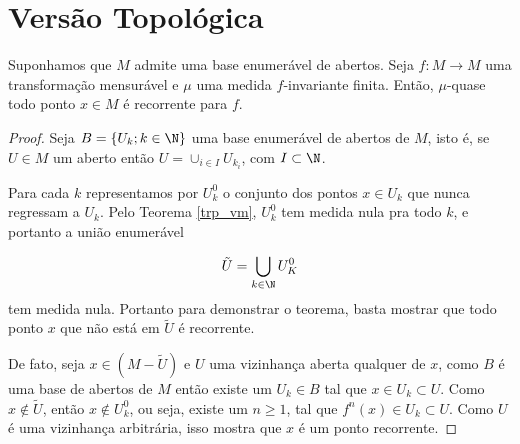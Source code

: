 \section{Versão Topológica}

\begin{teorema}\label{trp_vt}
Suponhamos que $M$ admite uma base enumerável de abertos. Seja $f:M \to M$ uma transformação mensurável e $\mu$ uma medida $f$-invariante finita. Então, $\mu$-quase todo ponto $x\in M$ é recorrente para $f$.
\end{teorema}

\begin{proof}
Seja $B=\{U_k;k\in\N\}$ uma base enumerável de abertos de $M$, isto é, se $U\in M$ um aberto então $U=\cup_{i\in I}{U_{k_i}}$, com $I\subset\N$. 

Para cada $k$ representamos por $U_{k}^{0}$ o conjunto dos pontos $x\in U_k$ que nunca regressam a $U_k$. Pelo Teorema \ref{trp_vm}, $U_{k}^{0}$ tem medida nula pra todo $k$, e portanto a união enumerável 

\begin{equation*}
\tilde{U}=\bigcup_{k\in\N}{U_{K}^{0}}         \vspace{0.2cm}
\end{equation*}
tem medida nula. Portanto para demonstrar o teorema, basta mostrar que todo ponto $x$ que não está em $\tilde{U}$ é recorrente. 

De fato, seja $x\in(M-\tilde{U})$ e $U$ uma vizinhança aberta qualquer de $x$, como $B$ é uma base de abertos de $M$ então existe um $U_k\in B$ tal que $x\in U_k\subset U$. Como $x\notin \tilde{U}$, então $x\notin U_{k}^{0}$, ou seja, existe um $n\geq1$, tal que $f^n(x)\in U_k\subset U$. Como $U$ é uma vizinhança arbitrária, isso mostra que $x$ é um ponto recorrente.
\end{proof}









